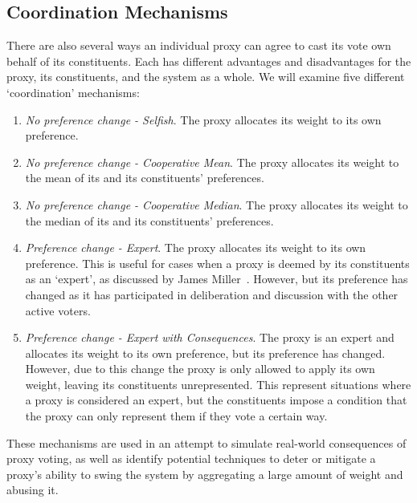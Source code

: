 \subsection{Coordination Mechanisms}\label{subsec:coordination-mechanisms}
There are also several ways an individual proxy can agree to cast its vote own behalf
of its constituents.
Each has different advantages and disadvantages for the proxy, its constituents, and
the system as a whole.
We will examine five different `coordination' mechanisms:
\begin{enumerate}
    \item {
        \textit{No preference change - Selfish}. 
        The proxy allocates its weight to its own preference.
    }
    \item {
        \textit{No preference change - Cooperative Mean}.
        The proxy allocates its weight to the mean of its and its constituents'
        preferences.
    }
    \item {
        \textit{No preference change - Cooperative Median}.
        The proxy allocates its weight to the median of its and its constituents'
        preferences.
    }
    \item {
        \textit{Preference change - Expert}.
        The proxy allocates its weight to its own preference.
        This is useful for cases when a proxy is deemed by its constituents as an
        `expert', as discussed by James Miller~\cite{Miller1969}.
        However, but its preference has changed as it has participated in
        deliberation and discussion with the other active voters.
    }
    \item {
        \textit{Preference change - Expert with Consequences}.
        The proxy is an expert and allocates its weight to its own preference, but its
        preference has changed.
        However, due to this change the proxy is only allowed to apply its own
        weight, leaving its constituents unrepresented.
        This represent situations where a proxy is considered an expert, but the
        constituents impose a condition that the proxy can only represent them if
        they vote a certain way.
    }
\end{enumerate}
These mechanisms are used in an attempt to simulate real-world consequences of proxy
voting, as well as identify potential techniques to deter or mitigate a proxy's
ability to swing the system by aggregating a large amount of weight and abusing it.
